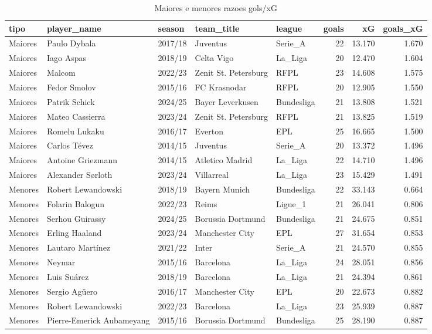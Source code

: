 \begin{table}

\caption{\label{tab:extremos_g20}Maiores e menores razoes gols/xG}
\centering
\begin{tabular}[t]{lllllrrr}
\toprule
tipo & player\_name & season & team\_title & league & goals & xG & goals\_xG\\
\midrule
Maiores & Paulo Dybala & 2017/18 & Juventus & Serie\_A & 22 & 13.170 & 1.670\\
Maiores & Iago Aspas & 2018/19 & Celta Vigo & La\_Liga & 20 & 12.470 & 1.604\\
Maiores & Malcom & 2022/23 & Zenit St. Petersburg & RFPL & 23 & 14.608 & 1.575\\
Maiores & Fedor Smolov & 2015/16 & FC Krasnodar & RFPL & 20 & 12.905 & 1.550\\
Maiores & Patrik Schick & 2024/25 & Bayer Leverkusen & Bundesliga & 21 & 13.808 & 1.521\\
\addlinespace
Maiores & Mateo Cassierra & 2023/24 & Zenit St. Petersburg & RFPL & 21 & 13.825 & 1.519\\
Maiores & Romelu Lukaku & 2016/17 & Everton & EPL & 25 & 16.665 & 1.500\\
Maiores & Carlos Tévez & 2014/15 & Juventus & Serie\_A & 20 & 13.372 & 1.496\\
Maiores & Antoine Griezmann & 2014/15 & Atletico Madrid & La\_Liga & 22 & 14.710 & 1.496\\
Maiores & Alexander Sørloth & 2023/24 & Villarreal & La\_Liga & 23 & 15.429 & 1.491\\
\addlinespace
Menores & Robert Lewandowski & 2018/19 & Bayern Munich & Bundesliga & 22 & 33.143 & 0.664\\
Menores & Folarin Balogun & 2022/23 & Reims & Ligue\_1 & 21 & 26.041 & 0.806\\
Menores & Serhou Guirassy & 2024/25 & Borussia Dortmund & Bundesliga & 21 & 24.675 & 0.851\\
Menores & Erling Haaland & 2023/24 & Manchester City & EPL & 27 & 31.654 & 0.853\\
Menores & Lautaro Martínez & 2021/22 & Inter & Serie\_A & 21 & 24.570 & 0.855\\
\addlinespace
Menores & Neymar & 2015/16 & Barcelona & La\_Liga & 24 & 28.051 & 0.856\\
Menores & Luis Suárez & 2018/19 & Barcelona & La\_Liga & 21 & 24.394 & 0.861\\
Menores & Sergio Agüero & 2016/17 & Manchester City & EPL & 20 & 22.673 & 0.882\\
Menores & Robert Lewandowski & 2022/23 & Barcelona & La\_Liga & 23 & 25.939 & 0.887\\
Menores & Pierre-Emerick Aubameyang & 2015/16 & Borussia Dortmund & Bundesliga & 25 & 28.190 & 0.887\\
\bottomrule
\end{tabular}
\end{table}
